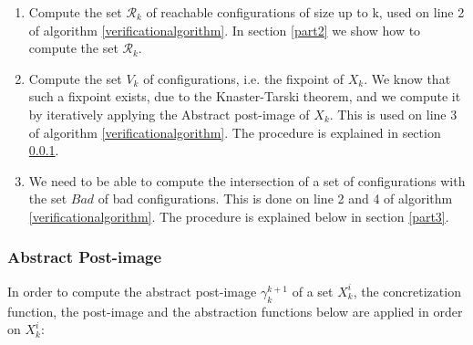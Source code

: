 \begin{enumerate}
\item
Compute the set $\mathcal{R}_k$ of reachable configurations of size up to k, used on line 2 of algorithm \ref{verificationalgorithm}. In section \ref{part2} we show how to compute the set $\mathcal{R}_k$.

\item
Compute the set $V_k$ of configurations, i.e. the fixpoint of $X_k$. We know that such a fixpoint exists, due to the Knaster-Tarski theorem\cite{tarski}, and we compute it by iteratively applying the Abstract post-image of $X_k$. This is used on line 3 of algorithm \ref{verificationalgorithm}. The procedure is explained in section \ref{part1}.
\item
We need to be able to compute the intersection of a set of configurations with the set $Bad$ of bad configurations. This is done on line 2 and 4 of algorithm \ref{verificationalgorithm}. The procedure is explained below in section \ref{part3}.
\end{enumerate}

\subsubsection{Abstract Post-image}
\label{part1}
In order to compute the abstract post-image $\gamma_k^{k+1}$ of a set $X_k^i$, the concretization function, the post-image and the abstraction functions below are applied in order on $X_k^i$:


